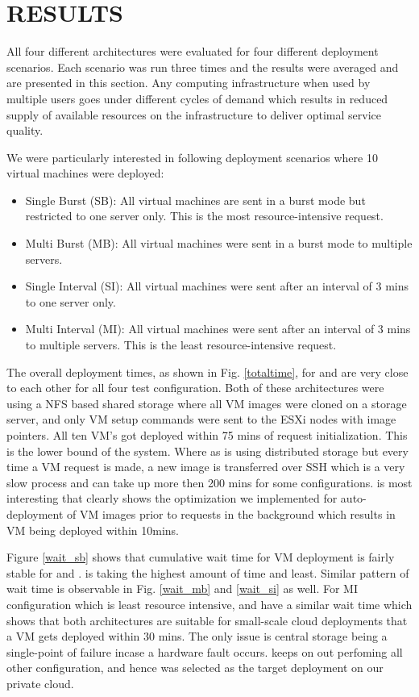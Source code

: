 \documentclass[acus]{JAC2003}
\begin{document}
\section{RESULTS}

All four different architectures were evaluated for four different deployment scenarios. Each scenario was run three times and the results were averaged and are presented in this section. Any computing infrastructure when used by multiple users goes under different cycles of demand which results in reduced supply of available resources on the infrastructure to deliver optimal service quality.

We were particularly interested in following deployment scenarios where 10 virtual machines were deployed:
\begin {itemize}
\item Single Burst (SB): All virtual machines are sent in a burst mode but restricted to one server only. This is the most resource-intensive request.
\item Multi Burst (MB): All virtual machines were sent in a burst mode to multiple servers.
\item Single Interval (SI): All virtual machines were sent after an interval of 3 mins to one server only.
\item Multi Interval (MI): All virtual machines were sent after an interval of 3 mins to multiple servers. This is the least resource-intensive request.
\end{itemize}

The overall deployment times, as shown in Fig. \ref{totaltime}, for \textit{} and \textit{} are very close to each other for all four test configuration. Both of these architectures were using a NFS based shared storage where all VM images were cloned on a storage server, and only VM setup commands were sent to the ESXi nodes with image pointers. All ten VM's got deployed within 75 mins of request initialization. This is the lower bound of the system.  Where as \textit{} is using distributed storage but every time a VM request is made, a new image is transferred over SSH which is a very slow process and can take up more then 200 mins for some configurations. \textit{} is most interesting that clearly shows the optimization we implemented for auto-deployment of VM images prior to requests in the background which results in VM being deployed within 10mins.

Figure \ref{wait_sb} shows that cumulative wait time for VM deployment is fairly stable for \textit{} and \textit{}. \textit{} is taking the highest amount of time and \textit{} least. Similar pattern of wait time is observable in Fig. \ref{wait_mb} and \ref{wait_si} as well. For MI configuration which is least resource intensive, \textit{} and \textit{} have a similar wait time which shows that both architectures are suitable for small-scale cloud deployments that a VM gets deployed within 30 mins. The only issue is central storage being a single-point of failure incase a hardware fault occurs. \textit{} keeps on out perfoming all other configuration, and hence was selected as the target deployment on our private cloud.
\end{document}
